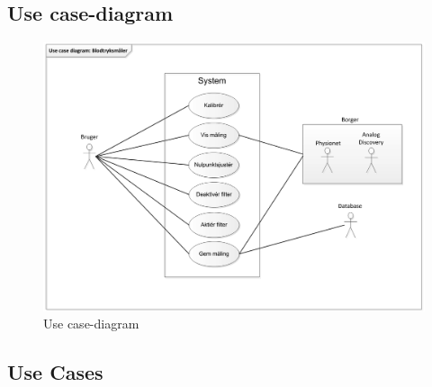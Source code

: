 \subsection{Use case-diagram}
\begin{figure}[H]
	\centering
	\includegraphics[width=1\textwidth]{Figurer/Snip20150930_2}
	\caption{Use case-diagram}
	\label{fig:Use case-diagram}
\end{figure}

\subsection{Use Cases}

